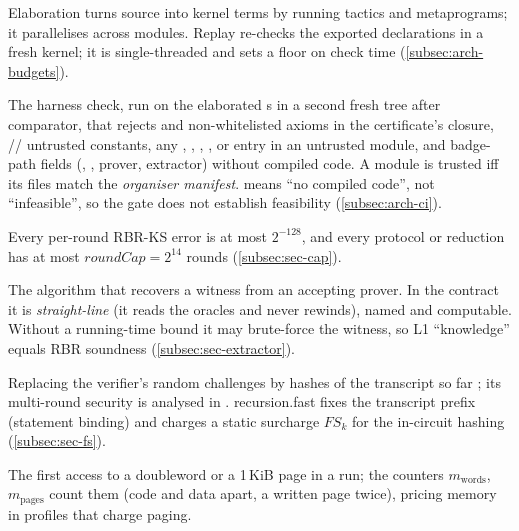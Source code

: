 \begin{description}[leftmargin=0pt,itemsep=2pt,parsep=0pt,font=\normalfont\bfseries]
\item[Elaboration vs replay.] Elaboration turns source into kernel terms by running tactics and
  metaprograms; it parallelises across modules. Replay re-checks the exported declarations in a
  fresh kernel; it is single-threaded and sets a floor on check time (\cref{subsec:arch-budgets}).

\item[Environment gate.] The harness check, run on the elaborated s in a second fresh
  tree after comparator, that rejects  and non-whitelisted axioms in the certificate's
  closure, // untrusted constants, any
  , , , ,  or
   entry in an untrusted module, and badge-path fields (, , prover,
  extractor) without compiled code. A module
  is trusted iff its files match the \emph{organiser manifest}.  means
  \enquote{no compiled code}, not \enquote{infeasible}, so the gate does not establish feasibility
  (\cref{subsec:arch-ci}).

\item[Error cap; round cap.] Every per-round RBR-KS error is at most $2^{-128}$, and every
  protocol or reduction has at most $\mathit{roundCap}=2^{14}$ rounds (\cref{subsec:sec-cap}).

\item[Extractor.] The algorithm that recovers a witness from an accepting prover. In the contract
  it is \emph{straight-line} (it reads the oracles and never rewinds), named and computable.
  Without a running-time bound it may brute-force the witness, so L1 \enquote{knowledge} equals
  RBR soundness (\cref{subsec:sec-extractor}).

\item[Fiat--Shamir.] Replacing the verifier's random challenges by hashes of the transcript so far
  \cite{FS86}; its multi-round security is analysed in \cite{CCHLRRW19,AFK22}. recursion.fast fixes the transcript prefix (statement binding) and
  charges a static surcharge $\mathit{FS}_k$ for the in-circuit hashing (\cref{subsec:sec-fs}).

\item[First touch.] The first access to a doubleword or a 1\,KiB page in a run; the counters
  $m_{\mathrm{words}}$, $m_{\mathrm{pages}}$ count them (code and data apart, a written page twice),
  pricing memory in profiles that charge paging.


\end{description}
